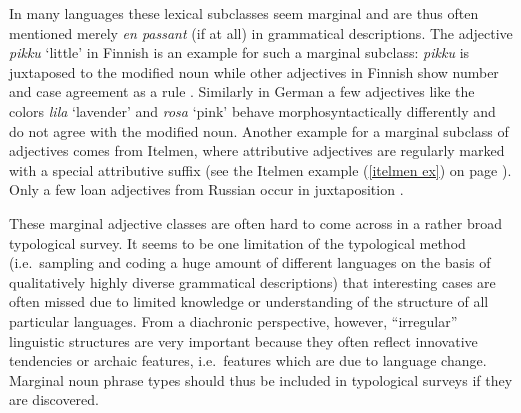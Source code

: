 In many languages these lexical subclasses seem marginal and are thus often mentioned merely \emph{en passant} (if at all) in grammatical descriptions. The adjective \textit{pikku} ‘little’ in Finnish is an example for such a marginal subclass: \textit{pikku} is juxtaposed to the modified noun while other adjectives in Finnish show number and case agreement as a rule \citep[75]{karlsson1999}. Similarly in German a few adjectives like the colors \textit{lila} ‘lavender’ and \textit{rosa} ‘pink’ behave morphosyntactically differently and do not agree with the modified noun. Another example for a marginal subclass of adjectives comes from Itelmen, where attributive adjectives are regularly marked with a special attributive suffix (see the Itelmen example (\ref{itelmen ex}) on page \pageref{itelmen synchr}). Only a few loan adjectives from Russian occur in juxtaposition \citep[60–71]{volodin1997}.

These marginal adjective classes are often hard to come across in a rather broad typological survey. It seems to be one limitation of the typological method (i.e.~sampling and coding a huge amount of different languages on the basis of qualitatively highly diverse grammatical descriptions) that interesting cases are often missed due to limited knowledge or understanding of the structure of all particular languages. From a diachronic perspective, however, “irregular” linguistic structures are very important because they often reflect innovative tendencies or archaic features, i.e.~features which are due to language change. Marginal noun phrase types should thus be included in typological surveys if they are discovered.

